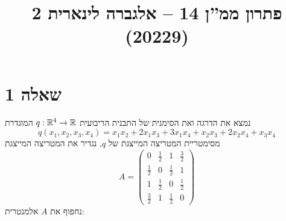 

\title{פתרון ממ''ן 14 – אלגברה לינארית 2 (20229)}


\maketitle

\section{שאלה 1}
נמצא את הדרגה ואת הסימנית של התבנית הריבועית $q : \mathbb{R}^4 \to \mathbb{R}$ המוגדרת
\[
	q(x_1, x_2, x_3, x_4) = x_1 x_2 + 2x_1 x_3 + 3x_1 x_4 + x_2 x_3 + 2x_2 x_4 + x_3 x_4
\]
מסימטריית המטריצה המייצגת של $q$, נגדיר את המטריצה המייצגת
\[
	A = \begin{pmatrix}
		0 & \frac{1}{2} & 1 & \frac{3}{2} \\
		\frac{1}{2} & 0 & \frac{1}{2} & 1 \\
		1 & \frac{1}{2} & 0 & \frac{1}{2} \\
		\frac{3}{2} & 1 & \frac{1}{2} & 0
	\end{pmatrix}
\]
נחפוף את $A$ אלמנטרית:
